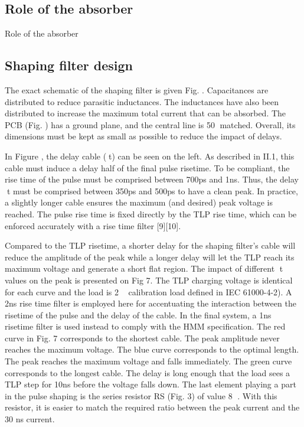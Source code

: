 \subsection{Role of the absorber}

Role of the absorber

\subsection{Shaping filter design}

The exact schematic of the shaping filter is given Fig. .
Capacitances are distributed to reduce parasitic inductances.
The inductances have also been distributed to increase the maximum total current that can be absorbed.
The PCB (Fig. ) has a ground plane, and the central line is 50 matched.
Overall, its dimensions must be kept as small as possible to reduce the impact of delays.


In Figure , the delay cable (t) can be seen on the left.
As described in II.1, this cable must induce a delay half of the final pulse risetime.
To be compliant, the rise time of the pulse must be comprised between 700ps and 1ns.
Thus, the delay t must be comprised between 350ps and 500ps to have a clean peak.
In practice, a slightly longer cable ensures the maximum (and desired) peak voltage is reached.
The pulse rise time is fixed directly by the TLP rise time, which can be enforced accurately with a rise time filter [9][10].


Compared to the TLP risetime, a shorter delay for the shaping filter’s cable will reduce the amplitude of the peak while a longer delay will let the TLP reach its maximum voltage and generate a short flat region. The impact of different t values on the peak is presented on Fig 7. The TLP charging voltage is identical for each curve and the load is 2 calibration load defined in IEC 61000-4-2). A 2ns rise time filter is employed here for accentuating the interaction between the risetime of the pulse and the delay of the cable. In the final system, a 1ns risetime filter is used instead to comply with the HMM specification.
The red curve in Fig. 7 corresponds to the shortest cable. The peak amplitude never reaches the maximum voltage. The blue curve corresponds to the optimal length. The peak reaches the maximum voltage and falls immediately. The green curve corresponds to the longest cable. The delay is long enough that the load sees a TLP step for 10ns before the voltage falls down.
The last element playing a part in the pulse shaping is the series resistor RS (Fig. 3) of value 8 . With this resistor, it is easier to match the required ratio between the peak current and the 30 ns current.

